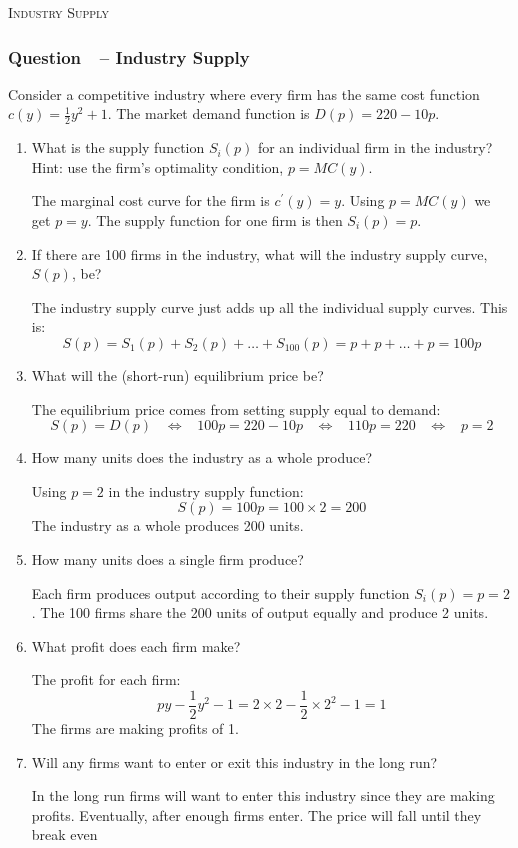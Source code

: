 \documentclass[12pt]{article}
\newcommand{\topic}[1]{\medskip\begin{center}\large\textsc{#1}\normalsize
  \end{center}}
\newcounter{question}[section]
\newcommand{\question}[1]{\refstepcounter{question}
  \subsubsection*{Question~\thequestion~-- #1}}
\newenvironment{subquestions}{
  \begin{enumerate}[label=(\roman*)]}{\end{enumerate}}
\begin{document}
\topic{Industry Supply}
\question{Industry Supply}
Consider a competitive industry where every firm has the same cost function
$c\left( y \right)=\frac{1}{2}y^2+1$. The market demand function is
$D\left( p \right) = 220 - 10p$.
\begin{subquestions}
  \item What is the supply function $S_i\left( p \right)$ for an individual
    firm in the industry? Hint: use the firm's optimality condition,
    $p=MC\left( y \right)$.

    \textcolor{solution-color}{
      The marginal cost curve for the firm is $c^\prime\left( y \right)=y$.
      Using $p=MC\left( y \right)$ we get $p=y$. The supply function for one
      firm is then $S_i\left( p \right)=p$.
    }
  \item If there are 100 firms in the industry, what will the industry supply
    curve, $S\left( p \right)$, be?

    \textcolor{solution-color}{
      The industry supply curve just adds up all the individual supply curves.
      This is:
      \[
        S\left( p \right)=S_1\left( p \right)+S_2\left( p
        \right)+\dots+S_{100}\left( p \right) = p + p + \dots + p= 100p
      \]
    }
  \item What will the (short-run) equilibrium price be?

    \textcolor{solution-color}{
      The equilibrium price comes from setting supply equal to demand:
      \[
        S\left( p \right)=D\left( p \right) \;\;\;\Longleftrightarrow \;\;\;
        100p=220-10p \;\;\;\Longleftrightarrow \;\;\;
        110p=220 \;\;\;\Longleftrightarrow \;\;\;
        p=2
      \]
    }
  \item How many units does the industry as a whole produce?

    \textcolor{solution-color}{
      Using $p=2$ in the industry supply function:
      \[
        S\left( p \right)=100p = 100\times2=200
      \]
      The industry as a whole produces 200 units.
    }

  \item How many units does a single firm produce?

    \textcolor{solution-color}{
      Each firm produces output according to their supply function $S_i\left( p
      \right)=p=2$. The 100 firms share the 200 units of output equally and
      produce 2 units.
    }
  \item What profit does each firm make?

    \textcolor{solution-color}{
      The profit for each firm:
      \[
        py- \frac{1}{2}y^2 - 1 = 2\times 2 - \frac{1}{2}\times2^2 - 1 = 1
      \]
      The firms are making profits of 1.
    }
  \item Will any firms want to enter or exit this industry in the long run?

    \textcolor{solution-color}{
      In the long run firms will want to enter this industry since they are
      making profits. Eventually, after enough firms enter. The price will fall
      until they break even
    }
\end{subquestions}
\end{document}
